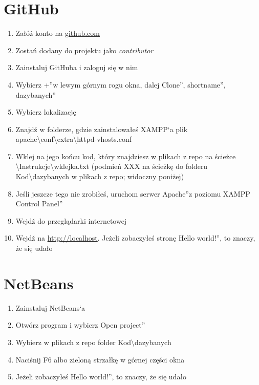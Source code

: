 \documentclass[a4paper, 11pt]{article}
\begin{document}
	\section{GitHub}
	\begin{enumerate}
		\item Załóż konto na \url{github.com}
		\item Zostań dodany do projektu jako \emph{contributor}
		\item Zainstaluj GitHuba i zaloguj się w nim
		\item Wybierz  \quotedblbase +\textquotedblright w lewym górnym rogu okna, dalej \quotedblbase Clone\textquotedblright, \quotedblbase shortname\textquotedblright, \quotedblbase dazybanych\textquotedblright
		\item Wybierz lokalizację
		\item Znajdź w folderze, gdzie zainstalowałeś XAMPP`a plik apache\textbackslash conf\textbackslash extra\textbackslash httpd-vhosts.conf
		\item Wklej na jego końcu kod, który znajdziesz w plikach z repo na ścieżce \textbackslash Instrukcje\textbackslash wklejka.txt (podmień XXX na ścieżkę do folderu Kod\textbackslash dazybanych w plikach z repo; widoczny poniżej)
		
		\item Jeśli jeszcze tego nie zrobiłeś, uruchom serwer \quotedblbase Apache\textquotedblright z poziomu \quotedblbase XAMPP Control Panel\textquotedblright
		\item Wejdź do przeglądarki internetowej
		\item Wejdź na \url{http://localhost}. Jeżeli zobaczyłeś stronę \quotedblbase Hello world!\textquotedblright, to znaczy, że się udało
	\end{enumerate}
	\section{NetBeans}
	\begin{enumerate}
		\item Zainstaluj NetBeans`a
		\item Otwórz program i wybierz \quotedblbase Open project\textquotedblright
		\item Wybierz w plikach z repo folder Kod\textbackslash dazybanych
		\item Naciśnij F6 albo zieloną strzałkę w górnej części okna
		\item Jeżeli zobaczyłeś \quotedblbase Hello world!\textquotedblright, to znaczy, że się udało 
	\end{enumerate}
\end{document}
